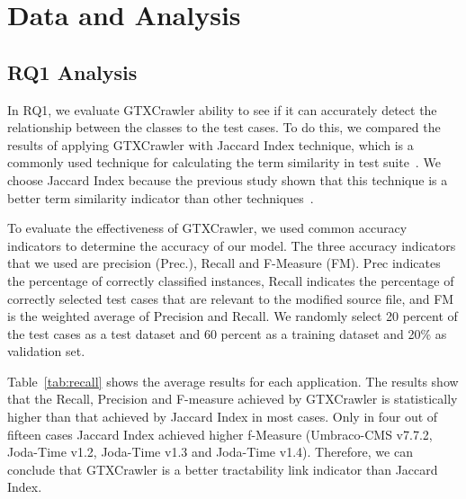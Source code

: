 \section{Data and Analysis}
\label{sec:data}

\subsection{RQ1 Analysis}
In RQ1, we evaluate  GTXCrawler ability to see 
if it can accurately detect the relationship 
between the classes to the test cases. 
To do this, we compared the results of applying GTXCrawler
with Jaccard Index technique, which is a commonly used
technique for calculating the term similarity in test suite~\cite{noor15}.
We choose Jaccard Index because the previous study 
shown that this technique is a better term similarity indicator
than other techniques~\cite{mondal15}. 

To evaluate the effectiveness of GTXCrawler, we used 
common accuracy indicators to determine the accuracy of
our model. The three accuracy indicators that we used are
precision (Prec.), Recall and F-Measure (FM). 
Prec indicates the percentage of correctly
classified instances, Recall indicates the percentage 
of correctly selected test cases that are relevant to the 
modified source file, 
and FM is the weighted average of Precision and Recall. 
We randomly select 20 percent of 
the test cases as a test dataset and 60 percent as 
a training dataset and 20\% as validation set.


Table~\ref{tab:recall} shows the average 
results for each application. 
The results show that the Recall, 
Precision and F-measure achieved by GTXCrawler 
is statistically higher than that achieved by Jaccard Index
in most cases. 
Only in four out of fifteen cases 
Jaccard Index achieved higher f-Measure
(Umbraco-CMS v7.7.2, Joda-Time v1.2, 
Joda-Time v1.3 and Joda-Time v1.4).
Therefore, we can conclude that GTXCrawler is
a better tractability link indicator than
Jaccard Index. 





